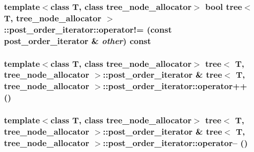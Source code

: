 \hypertarget{classtree_1_1post__order__iterator_59f0d0d145f27ed094a69214e1831102}{
\subsubsection{\setlength{\rightskip}{0pt plus 5cm}template$<$class T, class tree\_\-node\_\-allocator$>$ bool {\bf tree}$<$ T, tree\_\-node\_\-allocator $>$::post\_\-order\_\-iterator::operator!= (const {\bf post\_\-order\_\-iterator} \& {\em other}) const}}
\label{classtree_1_1post__order__iterator_59f0d0d145f27ed094a69214e1831102}


\hypertarget{classtree_1_1post__order__iterator_baba42c4ecb0a0bb8b21b0c28dfa3009}{
\subsubsection{\setlength{\rightskip}{0pt plus 5cm}template$<$class T, class tree\_\-node\_\-allocator$>$ {\bf tree}$<$ T, tree\_\-node\_\-allocator $>$::{\bf post\_\-order\_\-iterator} \& {\bf tree}$<$ T, tree\_\-node\_\-allocator $>$::post\_\-order\_\-iterator::operator++ ()}}
\label{classtree_1_1post__order__iterator_baba42c4ecb0a0bb8b21b0c28dfa3009}


\hypertarget{classtree_1_1post__order__iterator_f70bbd10b24ca0cf1c674e4ef40899db}{
\subsubsection{\setlength{\rightskip}{0pt plus 5cm}template$<$class T, class tree\_\-node\_\-allocator$>$ {\bf tree}$<$ T, tree\_\-node\_\-allocator $>$::{\bf post\_\-order\_\-iterator} \& {\bf tree}$<$ T, tree\_\-node\_\-allocator $>$::post\_\-order\_\-iterator::operator-- ()}}
\label{classtree_1_1post__order__iterator_f70bbd10b24ca0cf1c674e4ef40899db}


